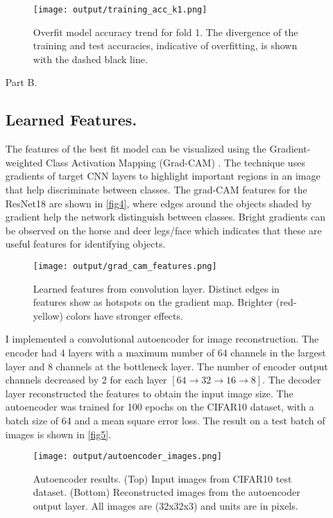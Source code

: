 \documentclass[12pt]{report}
\begin{document}
\begin{enumerate}
    \begin{figure}[H]
        \centering
        \texttt{[image: output/training\_acc\_k1.png]}
        \caption{Overfit model accuracy trend for fold 1. The divergence of the training and test accuracies, indicative of overfitting, is shown with the dashed black line.}
        \label{fig3}
    \end{figure}

    \item[Part B.]
    \subsection*{Learned Features.}
    The features of the best fit model can be visualized using the Gradient-weighted Class Activation Mapping (Grad-CAM) \cite{Selvaraju_2019}. The technique uses gradients of 
    target CNN layers to highlight important regions in an image that help discriminate between classes. The grad-CAM features for the ResNet18 are shown in \autoref{fig4}, where 
    edges around the objects shaded by gradient help the network distinguish between classes. Bright gradients can be observed on the horse and deer legs/face which indicates that 
    these are useful features for identifying objects.

    \begin{figure}[H]
        \centering
        \texttt{[image: output/grad\_cam\_features.png]}
        \caption{Learned features from convolution layer. Distinct edges in features show as hotspots on the gradient map. Brighter (red-yellow) colors have stronger effects.}
        \label{fig4}
    \end{figure}

    I implemented a convolutional autoencoder for image reconstruction. The encoder had 4 layers with a maximum number of 64 channels in the largest layer and 8 channels at the 
    bottleneck layer. The number of encoder output channels decreased by 2 for each layer $[64 \rightarrow 32 \rightarrow 16 \rightarrow 8]$. The decoder layer reconstructed the 
    features to obtain the input image size. The autoencoder was trained for 100 epochs on the CIFAR10 dataset, with a batch size of 64 and a mean square error loss. The result on 
    a test batch of images is shown in \autoref{fig5}.

    \begin{figure}[H]
        \centering
        \texttt{[image: output/autoencoder\_images.png]}
        \caption{Autoencoder results. (Top) Input images from CIFAR10 test dataset. (Bottom) Reconstructed images from the autoencoder output layer. All images are (32x32x3) and 
        units are in pixels.}
        \label{fig5}
    \end{figure}


\end{enumerate}
\end{document}
